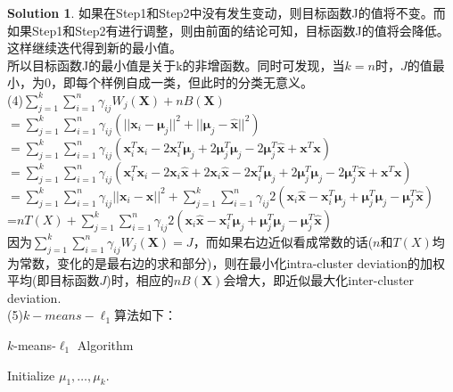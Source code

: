 \documentclass[a4paper,UTF8]{article}
\numberwithin{equation}{section}
\theoremstyle{definition}
\newtheorem*{solution}{Solution}
\begin{document}
\begin{solution}
如果在Step1和Step2中没有发生变动，则目标函数J的值将不变。而如果Step1和Step2有进行调整，则由前面的结论可知，目标函数J的值将会降低。这样继续迭代得到新的最小值。\\
所以目标函数J的最小值是关于k的非增函数。同时可发现，当$k=n$时，$J$的值最小，为0，即每个样例自成一类，但此时的分类无意义。\\
(4)$\sum_{j=1}^k\sum_{i=1}^n\gamma_{ij}W_j(\mathbf{X}) + nB(\mathbf{X})$\\
$=\sum_{j=1}^k\sum_{i=1}^n\gamma_{ij} ( || \mathbf{x}_i - \boldsymbol\mu_j ||^2 + || \boldsymbol\mu_j - \hat{\mathbf{x}} ||^2 )$\\
$=\sum_{j=1}^k\sum_{i=1}^n\gamma_{ij} ( \mathbf{x}_i^T\mathbf{x}_i -2\mathbf{x}_i^T\boldsymbol\mu_j + 2\boldsymbol\mu_j^T\boldsymbol\mu_j - 2\boldsymbol\mu_j^T\hat{\mathbf{x}} + \mathbf{x}^T\mathbf{x})$\\
$=\sum_{j=1}^k\sum_{i=1}^n\gamma_{ij} ( \mathbf{x}_i^T\mathbf{x}_i -2\mathbf{x}_i\hat{\mathbf{x}} +2\mathbf{x}_i\hat{\mathbf{x}}-2\mathbf{x}_i^T\boldsymbol\mu_j + 2\boldsymbol\mu_j^T\boldsymbol\mu_j - 2\boldsymbol\mu_j^T\hat{\mathbf{x}} + \mathbf{x}^T\mathbf{x} )$\\
$=\sum_{j=1}^k\sum_{i=1}^n\gamma_{ij} || \mathbf{x}_i -\hat{\mathbf{x}} ||^2 + \sum_{j=1}^k\sum_{i=1}^n\gamma_{ij} 2 ( \mathbf{x}_i\hat{\mathbf{x}} - \mathbf{x}_i^T\boldsymbol\mu_j + \boldsymbol\mu_j^T\boldsymbol\mu_j - \boldsymbol\mu_j^T\hat{\mathbf{x}})$\\
=$nT(X) + \sum_{j=1}^k\sum_{i=1}^n\gamma_{ij} 2 ( \mathbf{x}_i\hat{\mathbf{x}} - \mathbf{x}_i^T\boldsymbol\mu_j + \boldsymbol\mu_j^T\boldsymbol\mu_j - \boldsymbol\mu_j^T\hat{\mathbf{x}})$\\
因为$\sum_{j=1}^k\sum_{i=1}^n\gamma_{ij}W_j(\mathbf{X}) = J$，而如果右边近似看成常数的话($n$和$T(X)$均为常数，变化的是最右边的求和部分)，则在最小化intra-cluster deviation的加权平均(即目标函数$J$)时，相应的$nB(\mathbf{X})$会增大，即近似最大化inter-cluster deviation.\\
(5)$k-means-\ell_1$算法如下：\\
\begin{algorithm}[]
\label{algo:kmeans}
\caption{$k$-means-$\ell_1$ Algorithm}
\setcounter{AlgoLine}{0}
Initialize $\mu_1, \ldots, \mu_k$.\\
\end{algorithm}
\end{solution}
\end{document}
